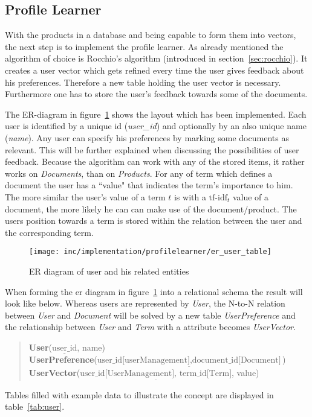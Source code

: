 
\subsection{Profile Learner}
\label{sec:rocchio-impl}
With the products in a database and being capable to form them into vectors, the next step is to implement the profile learner.
As already mentioned the algorithm of choice is Rocchio's algorithm (introduced in section~\ref{sec:rocchio}).
It creates a user vector which gets refined every time the user gives feedback about his preferences.
Therefore a new table holding the user vector is necessary.
Furthermore one has to store the user's feedback towards some of the documents.

The ER-diagram in figure~\ref{fig:er_user_table} shows the layout which has been implemented.
Each user is identified by a unique id (\textit{user\_id}) and optionally by an also unique name (\textit{name}).
Any user can specify his preferences by marking some documents as relevant.
This will be further explained when discussing the possibilities of user feedback.
Because the algorithm can work with any of the stored items, it rather works on \textit{Documents}, than on \textit{Products}.
For any of term which defines a document the user has a ``value" that indicates the term's importance to him.
The more similar the user's value of a term $t$ is with a $\text{tf-idf}_t$ value of a document, the more likely he can can make use of the document/product.
The users position towards a term is stored within the relation between the user and the corresponding term.

\begin{figure}[h]
    \center
    \texttt{[image: inc/implementation/profilelearner/er\_user\_table]}
    \caption{ER diagram of user and his related entities}
    \label{fig:er_user_table}
\end{figure}

When forming the er diagram in figure~\ref{fig:er_user_table} into a relational schema the result will look like below.
Whereas users are represented by \textit{User}, the N-to-N relation between \textit{User} and \textit{Document} will be solved by a new table \textit{UserPreference} and the relationship between \textit{User} and \textit{Term} with a attribute becomes \textit{UserVector}.
\begin{quote}
    \textbf{User}($\underline{\text{user\_id}}$, name)\\
    \textbf{UserPreference}($\underline{\text{user\_id[userManagement]},\text{document\_id[Document]}}$)\\
    \textbf{UserVector}($\underline{\text{user\_id[UserManagement], term\_id[Term]}}$, value)\\
\end{quote}
Tables filled with example data to illustrate the concept are displayed in table~\ref{tab:user}.

